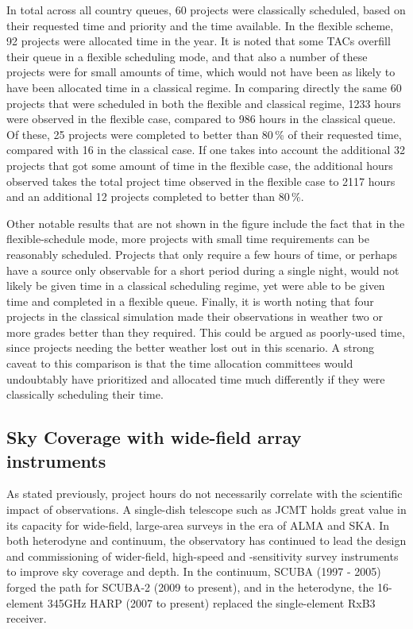 \documentclass[]{spie}  %
\begin{document}
In total across all country queues, 60 projects were classically
scheduled, based on their requested time and priority and the time
available. In the flexible scheme, 92 projects were allocated time in
the year. It is noted that some TACs overfill their queue in a
flexible scheduling mode, and that also a number of these projects
were for small amounts of time, which would not have been as likely to
have been allocated time in a classical regime. In comparing directly
the same 60 projects that were scheduled in both the flexible and
classical regime, 1233 hours were observed in the flexible case,
compared to 986 hours in the classical queue. Of these, 25 projects
were completed to better than 80\,\% of their requested time, compared
with 16 in the classical case. If one takes into account the
additional 32 projects that got some amount of time in the flexible
case, the additional hours observed takes the total project time
observed in the flexible case to 2117 hours and an additional 12
projects completed to better than 80\,\%.

Other notable results that are not shown in the figure include the
fact that in the flexible-schedule mode, more projects with small time
requirements can be reasonably scheduled. Projects that only require a
few hours of time, or perhaps have a source only observable for a
short period during a single night, would not likely be given time in
a classical scheduling regime, yet were able to be given time and
completed in a flexible queue. Finally, it is worth noting that four
projects in the classical simulation made their observations in
weather two or more grades better than they required. This could be
argued as poorly-used time, since projects needing the better weather
lost out in this scenario. A strong caveat to this comparison is that
the time allocation committees would undoubtably have prioritized and
allocated time much differently if they were classically scheduling
their time.

\subsection{Sky Coverage with wide-field array instruments}

As stated previously, project hours do not necessarily correlate with
the scientific impact of observations. A single-dish telescope such as
JCMT holds great value in its capacity for wide-field, large-area
surveys in the era of ALMA and SKA. In both heterodyne and continuum,
the observatory has continued to lead the design and commissioning of
wider-field, high-speed and -sensitivity survey instruments to improve
sky coverage and depth. In the continuum, SCUBA (1997 - 2005) forged
the path for SCUBA-2 (2009 to present), and in the heterodyne, the
16-element 345GHz HARP (2007 to present) replaced the single-element
RxB3 receiver.\cite{1998SPIE.3357..620C} 
\end{document}

